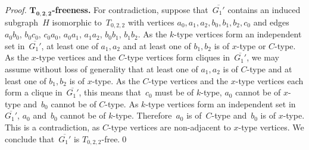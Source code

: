 \documentclass{llncs}
\begin{document}
\begin{proof}
\medskip
\noindent
{\bf $\mathbf{T_{0,2,2}}$-freeness.}
For contradiction, suppose that~$\overline{G_1'}$ contains an induced subgraph~$H$ isomorphic to~$T_{0,2,2}$ with vertices $a_0,a_1,a_2,b_0,b_1,b_2,c_0$ and edges~$a_0b_0$, $b_0c_0$, $c_0a_0$, $a_0a_1$, $a_1a_2$, $b_0b_1$, $b_1b_2$.
As the $k$-type vertices form an independent set in~$\overline{G_1'}$, at least one of $a_1,a_2$ and at least one of $b_1,b_2$ is of $x$-type or $C$-type.
As the $x$-type vertices and the $C$-type vertices form cliques in~$\overline{G_1'}$, we may assume without loss of generality that at least one of $a_1,a_2$ is of $C$-type and at least one of $b_1,b_2$ is of $x$-type.
As the $C$-type vertices and the $x$-type vertices each form a clique in~$\overline{G_1'}$, this means that~$c_0$ must be of $k$-type, $a_0$ cannot be of $x$-type and~$b_0$ cannot be of $C$-type.
As $k$-type vertices form an independent set in~$\overline{G_1'}$, $a_0$ and~$b_0$ cannot be of $k$-type.
Therefore~$a_0$ is of~$C$-type and~$b_0$ is of $x$-type.
This is a contradiction, as $C$-type vertices are non-adjacent to $x$-type vertices.
We conclude that~$\overline{G_1'}$ is $T_{0,2,2}$-free.\qed
\end{proof}
\end{document}

